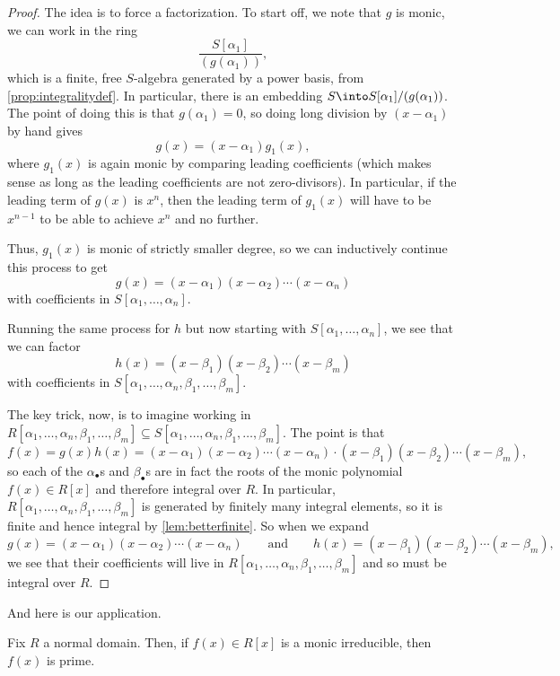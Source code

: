 \begin{proof}
	The idea is to force a factorization. To start off, we note that $g$ is monic, we can work in the ring
	\[\frac{S[\alpha_1]}{(g(\alpha_1))},\]
	which is a finite, free $S$-algebra generated by a power basis, from \autoref{prop:integralitydef}. In particular, there is an embedding $S\into S[\alpha_1]/(g(\alpha_1))$. The point of doing this is that $g(\alpha_1)=0$, so doing long division by $(x-\alpha_1)$ by hand gives
	\[g(x)=(x-\alpha_1)g_1(x),\]
	where $g_1(x)$ is again monic by comparing leading coefficients (which makes sense as long as the leading coefficients are not zero-divisors). In particular, if the leading term of $g(x)$ is $x^n$, then the leading term of $g_1(x)$ will have to be $x^{n-1}$ to be able to achieve $x^n$ and no further.
	
	Thus, $g_1(x)$ is monic of strictly smaller degree, so we can inductively continue this process to get
	\[g(x)=(x-\alpha_1)(x-\alpha_2)\cdots(x-\alpha_n)\]
	with coefficients in $S[\alpha_1,\ldots,\alpha_n]$.

	Running the same process for $h$ but now starting with $S[\alpha_1,\ldots,\alpha_n]$, we see that we can factor
	\[h(x)=(x-\beta_1)(x-\beta_2)\cdots(x-\beta_m)\]
	with coefficients in $S[\alpha_1,\ldots,\alpha_n,\beta_1,\ldots,\beta_m]$.

	The key trick, now, is to imagine working in $R[\alpha_1,\ldots,\alpha_n,\beta_1,\ldots,\beta_m]\subseteq S[\alpha_1,\ldots,\alpha_n,\beta_1,\ldots,\beta_m]$. The point is that
	\[f(x)=g(x)h(x)=(x-\alpha_1)(x-\alpha_2)\cdots(x-\alpha_n)\cdot(x-\beta_1)(x-\beta_2)\cdots(x-\beta_m),\]
	so each of the $\alpha_\bullet$s and $\beta_\bullet$s are in fact the roots of the monic polynomial $f(x)\in R[x]$ and therefore integral over $R$. In particular, $R[\alpha_1,\ldots,\alpha_n,\beta_1,\ldots,\beta_m]$ is generated by finitely many integral elements, so it is finite and hence integral by \autoref{lem:betterfinite}. So when we expand
	\[g(x)=(x-\alpha_1)(x-\alpha_2)\cdots(x-\alpha_n)\qquad\text{and}\qquad h(x)=(x-\beta_1)(x-\beta_2)\cdots(x-\beta_m),\]
	we see that their coefficients will live in $R[\alpha_1,\ldots,\alpha_n,\beta_1,\ldots,\beta_m]$ and so must be integral over $R$.
\end{proof}
And here is our application.
\begin{corollary}
	Fix $R$ a normal domain. Then, if $f(x)\in R[x]$ is a monic irreducible, then $f(x)$ is prime.
\end{corollary}
